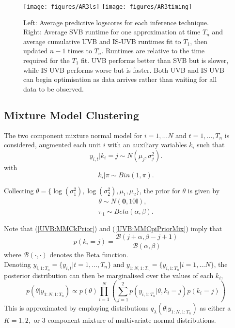 \documentclass[
12pt, %
onehalfspacing, %
nohyperref, %
headsepline, %
chapterinoneline, %
]{MastersDoctoralThesis} %
\begin{document}
\begin{figure}[htbp]
    \centering
    {{\texttt{[image: figures/AR3ls]} }}%
    \qquad
    {{\texttt{[image: figures/AR3timing]} }}%
    \caption{Left: Average predictive logscores for each inference technique. Right: Average SVB runtime for one approximation at time $T_n$ and average cumulative UVB and IS-UVB runtimes fit to $T_1$, then updated $n-1$ times to $T_n$. Runtimes are relative to the time required for the $T_1$ fit.
UVB performs better than SVB but is slower, while IS-UVB performs worse but is faster. Both UVB and IS-UVB can begin optimisation as data arrives rather than waiting for all data to be observed.}%
    \label{fig:UVBAR3Timing}%
\end{figure}

\subsection{Mixture Model Clustering}
\label{subsec:UVBMMC}

The two component mixture normal model for $i = 1, \ldots N$ and $t = 1, \ldots, T_n$ is considered, augmented each unit $i$ with an auxiliary variables $k_i$ such that
\begin{equation}
\label{UVB:MMCmixNormalDGP2}
y_{i, t} | k_i = j \sim  N(\mu_j, \sigma^2_{j}).
\end{equation}
with 
\begin{equation}
\label{UVB:MMCkPrior}
k_i | \pi \sim Bin(1, \pi).
\end{equation}

Collecting $\theta = \{\log(\sigma^2_1), \log(\sigma^2_2), \mu_1, \mu_2 \}$, the prior for $\theta$ is given by
\begin{align}
\theta \sim N(\boldsymbol{0}, 10 \mathbb{I}), \\
\pi_1 \sim Beta(\alpha, \beta). \label{UVB:MMCpiPriorMix}
\end{align}


Note that (\ref{UVB:MMCkPrior}) and (\ref{UVB:MMCpiPriorMix}) imply that 
\begin{equation}
\label{UVB:MMCkMarginalMix}
p(k_i = j) = \frac{\mathcal{B}(j + \alpha, \beta - j + 1)}{\mathcal{B}(\alpha, \beta)}
\end{equation}
where $\mathcal{B}(\cdot, \cdot)$ denotes the Beta function.
\\

Denoting $y_{i, 1:T_n} = \{y_{i, t} | t = 1, \ldots, T_n\}$ and $y_{1:N, 1:T_n} = \{y_{i, 1:T_n} | i = 1, \ldots N \}$, the posterior distribution can then be marginalised over the values of each $k_i$,
\begin{equation}
\label{UVB:MMCMarginal}
p(\theta | y_{1:N, 1:T_n}) \propto p(\theta) \prod_{i=1}^N \left( \sum_{j=1}^2 p(y_{i, 1:T_n} | \theta, k_i = j) p(k_i = j) \right)
\end{equation}
This is approximated by employing distributions $q_{\lambda}(\theta | y_{1:N, 1:T_n})$ as either a $K = 1, 2,$ or $3$ component mixture of multivariate normal distributions. 
\\
\end{document}
